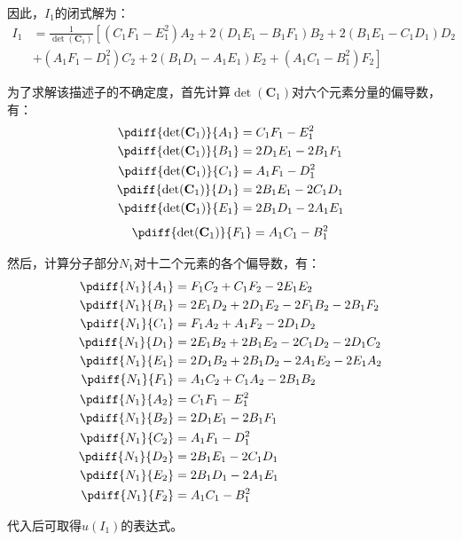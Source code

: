 \documentclass{article}
\begin{document}
因此，$I_1$的闭式解为：
\begin{align*}
  I_1&=\frac{1}{\det(\mathbf{C}_1)}\left[(C_1F_1-E_1^2)A_2+2(D_1E_1-B_1F_1)B_2+2(B_1E_1-C_1D_1)D_2\right.\\
  &\left.+(A_1F_1-D_1^2)C_2+2(B_1D_1-A_1E_1)E_2+(A_1C_1-B_1^2)F_2\right]
\end{align*}\par
为了求解该描述子的不确定度，首先计算$\det(\mathbf{C}_1)$对六个元素分量的偏导数，有：
\begin{align*}
  \pdiff{\det(\mathbf{C}_1)}{A_1}&=C_1F_1-E_1^2\\
  \pdiff{\det(\mathbf{C}_1)}{B_1}&=2D_1E_1-2B_1F_1\\
  \pdiff{\det(\mathbf{C}_1)}{C_1}&=A_1F_1-D_1^2\\
  \pdiff{\det(\mathbf{C}_1)}{D_1}&=2B_1E_1-2C_1D_1\\
  \pdiff{\det(\mathbf{C}_1)}{E_1}&=2B_1D_1-2A_1E_1
\end{align*}
\begin{equation*}
  \pdiff{\det(\mathbf{C}_1)}{F_1}=A_1C_1-B_1^2
\end{equation*}\par
然后，计算分子部分$N_1$对十二个元素的各个偏导数，有：
\begin{align*}
  \pdiff{N_1}{A_1}&=F_1C_2+C_1F_2-2E_1E_2\\
  \pdiff{N_1}{B_1}&=2E_1D_2+2D_1E_2-2F_1B_2-2B_1F_2\\
  \pdiff{N_1}{C_1}&=F_1A_2+A_1F_2-2D_1D_2\\
  \pdiff{N_1}{D_1}&=2E_1B_2+2B_1E_2-2C_1D_2-2D_1C_2\\
  \pdiff{N_1}{E_1}&=2D_1B_2+2B_1D_2-2A_1E_2-2E_1A_2\\
  \pdiff{N_1}{F_1}&=A_1C_2+C_1A_2-2B_1B_2\\
  \pdiff{N_1}{A_2}&=C_1F_1-E_1^2\\
  \pdiff{N_1}{B_2}&=2D_1E_1-2B_1F_1\\
  \pdiff{N_1}{C_2}&=A_1F_1-D_1^2\\
  \pdiff{N_1}{D_2}&=2B_1E_1-2C_1D_1\\
  \pdiff{N_1}{E_2}&=2B_1D_1-2A_1E_1\\
  \pdiff{N_1}{F_2}&=A_1C_1-B_1^2
\end{align*}\par
代入后可取得$u(I_1)$的表达式。
\end{document}
